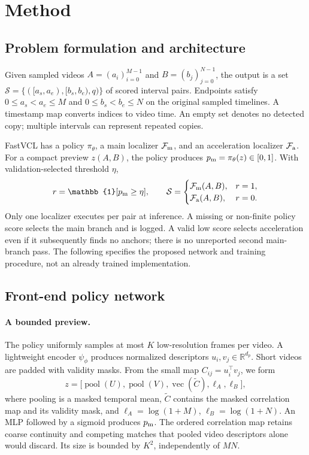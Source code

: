 \section{Method}
\label{sec:method}

\subsection{Problem formulation and architecture}
Given sampled videos $A=(a_i)_{i=0}^{M-1}$ and $B=(b_j)_{j=0}^{N-1}$, the output is a set
$\mathcal S=\{([a_s,a_e),[b_s,b_e),q)\}$ of scored interval pairs. Endpoints satisfy
$0\le a_s<a_e\le M$ and $0\le b_s<b_e\le N$ on the original sampled timelines. A timestamp
map converts indices to video time. An empty set denotes no detected copy; multiple intervals
can represent repeated copies.

FastVCL has a policy $\pi_\theta$, a main localizer $\mathcal F_{\rm m}$, and an acceleration
localizer $\mathcal F_{\rm a}$. For a compact preview $z(A,B)$, the policy produces
$p_{\rm m}=\pi_\theta(z)\in[0,1]$. With validation-selected threshold $\eta$,
\begin{equation}
r=\mathbb{1}[p_{\rm m}\ge\eta],\qquad
\mathcal S=\begin{cases}
\mathcal F_{\rm m}(A,B),&r=1,\\
\mathcal F_{\rm a}(A,B),&r=0.
\end{cases}
\label{eq:route}
\end{equation}
Only one localizer executes per pair at inference. A missing or non-finite policy score
selects the main branch and is logged. A valid low score selects acceleration even if it
subsequently finds no anchors; there is no unreported second main-branch pass. The following
specifies the proposed network and training procedure, not an already trained implementation.

\subsection{Front-end policy network}
\label{sec:policy}
\paragraph{A bounded preview.}
The policy uniformly samples at most $K$ low-resolution frames per video. A lightweight
encoder $\psi_\phi$ produces normalized descriptors $u_i,v_j\in\mathbb R^{d_p}$.
Short videos are padded with validity masks. From the small map $C_{ij}=u_i^\top v_j$,
we form
\begin{equation}
z=\bigl[\operatorname{pool}(U),\operatorname{pool}(V),
\operatorname{vec}(\widetilde C),\ell_A,\ell_B\bigr],
\label{eq:preview}
\end{equation}
where pooling is a masked temporal mean, $\widetilde C$ contains the masked correlation map
and its validity mask, and $\ell_A=\log(1+M)$, $\ell_B=\log(1+N)$. An MLP followed by a
sigmoid produces $p_{\rm m}$. The ordered correlation map retains coarse continuity and
competing matches that pooled video descriptors alone would discard. Its size is bounded
by $K^2$, independently of $MN$.

